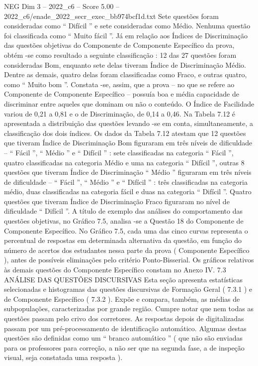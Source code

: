 \begin{textsample}{NEG Dim 3 – 2022\_c6 – Score 5.00 – 2022\_c6/enade\_2022\_secr\_exec\_bb974bcf1d.txt}
Sete questões foram consideradas como “ Difícil ” e sete consideradas como Médio.
Nenhuma questão foi classificada como “ Muito fácil ”.
Já em relação aos Índices de Discriminação das questões objetivas do Componente de Componente Específico da prova, obtém -se como resultado a seguinte classificação : 12 das 27 questões foram consideradas Bom, enquanto sete delas tiveram Índice de Discriminação Médio.
Dentre as demais, quatro delas foram classificadas como Fraco, e outras quatro, como “ Muito bom ”.
Constata -se, assim, que a prova – no que se refere ao Componente de Componente Específico – possuía boa e média capacidade de discriminar entre aqueles que dominam ou não o conteúdo.
O Índice de Facilidade variou de 0,21 a 0,81 e o de Discriminação, de 0,14 a 0,46.
Na Tabela 7.12 é apresentada a distribuição das questões levando -se em conta, simultaneamente, a classificação dos dois índices.
Os dados da Tabela 7.12 atestam que 12 questões que tiveram Índice de Discriminação Bom figuraram em três níveis de dificuldade – “ Fácil ”, “ Médio ” e “ Difícil ” : sete classificadas na categoria “ Fácil ”, quatro classificadas na categoria Médio e uma na categoria “ Difícil ”, outras 8 questões que tiveram Índice de Discriminação “ Médio ” figuraram em três níveis de dificuldade – “ Fácil ”, “ Médio ” e “ Difícil ” : três classificadas na categoria médio, duas classificadas na categoria fácil e duas na categoria “ Difícil ”.
Quatro questões que tiveram Índice de Discriminação Fraco figuraram no nível de dificuldade “ Difícil ”.
A título de exemplo das análises do comportamento das questões objetivas, no Gráfico 7.5, analisa -se a Questão 18 do Componente de Componente Específico.
No Gráfico 7.5, cada uma das cinco curvas representa o percentual de respostas em determinada alternativa da questão, em função do número de acertos dos estudantes nessa parte da prova ( Componente Específico ), antes de possíveis eliminações pelo critério Ponto-Bisserial.
Os gráficos relativos às demais questões do Componente Específico constam no Anexo IV. 7.3 ANÁLISE DAS QUESTÕES DISCURSIVAS Esta seção apresenta estatísticas selecionadas e histogramas das questões discursivas de Formação Geral ( 7.3.1 ) e de Componente Específico ( 7.3.2 ).
Expõe e compara, também, as médias de subpopulações, caracterizadas por grande região.
Cumpre notar que nem todas as questões passam pelo crivo dos corretores.
As respostas depois de digitalizadas passam por um pré-processamento de identificação automático.
Algumas destas questões são definidas como um “ branco automático ” ( que não são enviadas para os professores para correção, a não ser que na segunda fase, a de inspeção visual, seja constatada uma resposta ).

\end{textsample}
